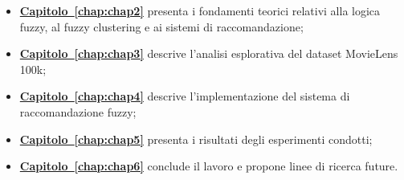 \begin{itemize}
    \item \textbf{\hyperref[chap:chap2]{Capitolo~\ref*{chap:chap2}}} presenta i fondamenti teorici relativi alla logica fuzzy, al fuzzy clustering e ai sistemi di raccomandazione;
    \item \textbf{\hyperref[chap:chap3]{Capitolo~\ref*{chap:chap3}}} descrive l'analisi esplorativa del dataset MovieLens 100k;
    \item \textbf{\hyperref[chap:chap4]{Capitolo~\ref*{chap:chap4}}} descrive l'implementazione del sistema di raccomandazione fuzzy;
    \item \textbf{\hyperref[chap:chap5]{Capitolo~\ref*{chap:chap5}}} presenta i risultati degli esperimenti condotti;
    \item \textbf{\hyperref[chap:chap6]{Capitolo~\ref*{chap:chap6}}} conclude il lavoro e propone linee di ricerca future.
\end{itemize}
